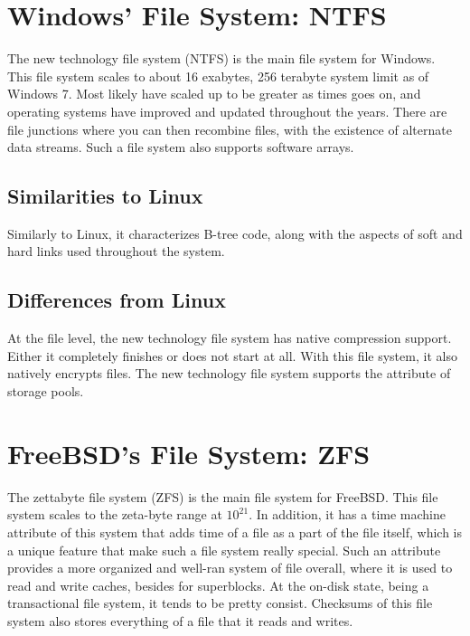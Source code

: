 \documentclass[letterpaper,10pt,onecolumn]{IEEEtran}
\begin{document}
\section*{Windows' File System: NTFS}
\par
The new technology file system (NTFS) is the main file system for Windows. This file system scales to about 16 exabytes, 256 terabyte system limit as of Windows 7. Most likely have scaled up to be greater as times goes on, and operating systems have improved and updated throughout the years. There are file junctions where you can then recombine files, with the existence of alternate data streams. Such a file system also supports software arrays.

	\subsection*{Similarities to Linux}
	\par
	Similarly to Linux, it characterizes B-tree code, along with the aspects of soft and hard links used throughout the system.

	\subsection*{Differences from Linux}
	\par
	At the file level, the new technology file system has native compression support. Either it completely finishes or does not start at all. With this file system, it also natively encrypts files. The new technology file system supports the attribute of storage pools.
	

\section*{FreeBSD's File System: ZFS}
\par
The zettabyte file system (ZFS) is the main file system for FreeBSD. This file system scales to the zeta-byte range at \(10^{21}\). In addition, it has a time machine attribute of this system that adds time of a file as a part of the file itself, which is a unique feature that make such a file system really special. Such an attribute provides a more organized and well-ran system of file overall, where it is used to read and write caches, besides for superblocks. At the on-disk state, being a transactional file system, it tends to be pretty consist. Checksums of this file system also stores everything of a file that it reads and writes.
\end{document}
